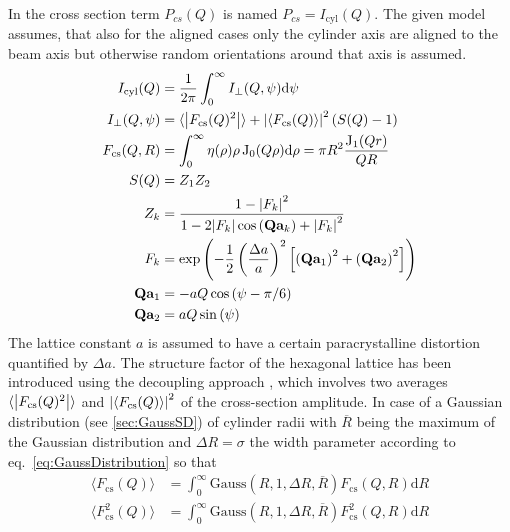 In \cite{Hashimoto1994,Penttilae2019} the cross section term $P_{cs}(Q)$ is named $P_{cs}=I_\mathrm{cyl}(Q)$. The given model assumes, that also for the aligned cases only the cylinder axis are aligned to the beam axis but otherwise random orientations around that axis is assumed.
\begin{subequations}
\begin{align}
  I_\mathrm{cyl}(Q) &= \frac{1}{2\pi}\int_0^\infty I_\perp(Q,\psi) \mathrm{d}\psi \label{eq:paracystalHEXcylperp} \\
  I_\perp(Q,\psi) &= \langle \abs{F_\mathrm{cs}(Q)^2}\rangle + \abs{\langle F_\mathrm{cs}(Q)\rangle}^2 \left(S(Q)-1\right)\\
  F_\mathrm{cs}(Q,R) &= \int_0^\infty \eta(\rho) \rho\operatorname{J}_0(Q\rho) \mathrm{d}\rho = \pi R^2 \frac{\operatorname{J}_1(Qr)}{QR} \\
  S(Q) &= Z_1 Z_2  \\
  Z_k &= \frac{1-\abs{F_k}^2}{1-2\abs{F_k}\cos\left(\mathbf{Q}\mathbf{a}_k\right) + \abs{F_k}^2}  \label{eq:paraHEXZkvers_1} \\
  F_k &= \exp\left( -\frac12 \left(\frac{\Delta a}{a}\right)^2\left[\left(\mathbf{Q}\mathbf{a}_1\right)^2 + \left(\mathbf{Q}\mathbf{a}_2\right)^2\right]\right) \\
  \mathbf{Q}\mathbf{a}_1 &= -aQ\cos\left(\psi-\pi/6\right)\\
  \mathbf{Q}\mathbf{a}_2 &=  aQ\sin\left(\psi\right)
\end{align}
\end{subequations}
The lattice constant $a$ is assumed to have a certain paracrystalline distortion quantified by $\Delta a$. The structure factor of the hexagonal lattice has been introduced using the decoupling approach \cite{Kotlarchyk1983}, which involves two averages $\langle \abs{F_\mathrm{cs}(Q)^2}\rangle$ and $\abs{\langle F_\mathrm{cs}(Q)\rangle}^2$ of the cross-section amplitude. In case of a Gaussian distribution (see \ref{sec:GaussSD}) of cylinder radii with $\overline{R}$ being the maximum of the Gaussian distribution and $\Delta R=\sigma$ the width parameter according to eq.\ \ref{eq:GaussDistribution} so that
\begin{align}
\langle F_\mathrm{cs}(Q)\rangle &= \int_0^\infty \text{Gauss}(R,1,\Delta R,\overline{R}) F_\mathrm{cs}(Q,R) \mathrm{d}R \\
\langle F_\mathrm{cs}^2(Q)\rangle &= \int_0^\infty \text{Gauss}(R,1,\Delta R,\overline{R}) F_\mathrm{cs}^2(Q,R) \mathrm{d}R
\end{align}
